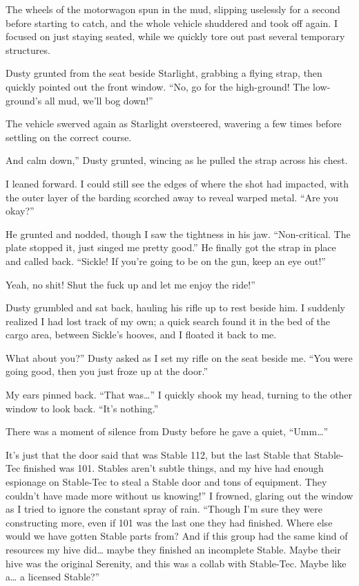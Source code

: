 The wheels of the motorwagon spun in the mud, slipping uselessly for a second before starting to catch, and the whole vehicle shuddered and took off again. I focused on just staying seated, while we quickly tore out past several temporary structures.

Dusty grunted from the seat beside Starlight, grabbing a flying strap, then quickly pointed out the front window. “No, go for the high-ground! The low-ground’s all mud, we’ll bog down!”

The vehicle swerved again as Starlight oversteered, wavering a few times before settling on the correct course.

\leavevmode{}And calm down,” Dusty grunted, wincing as he pulled the strap across his chest.

I leaned forward. I could still see the edges of where the shot had impacted, with the outer layer of the barding scorched away to reveal warped metal. “Are you okay?”

He grunted and nodded, though I saw the tightness in his jaw. “Non-critical. The plate stopped it, just singed me pretty good.” He finally got the strap in place and called back. “Sickle! If you’re going to be on the gun, keep an eye out!”

\leavevmode{}Yeah, no shit! Shut the fuck up and let me enjoy the ride!”

Dusty grumbled and sat back, hauling his rifle up to rest beside him. I suddenly realized I had lost track of my own; a quick search found it in the bed of the cargo area, between Sickle’s hooves, and I floated it back to me.

\leavevmode{}What about you?” Dusty asked as I set my rifle on the seat beside me. “You were going good, then you just froze up at the door.”

My ears pinned back. “That was…” I quickly shook my head, turning to the other window to look back. “It’s nothing.”

There was a moment of silence from Dusty before he gave a quiet, “Umm…”

\leavevmode{}It’s just that the door said that was Stable 112, but the last Stable that Stable-Tec finished was 101. Stables aren’t subtle things, and my hive had enough espionage on Stable-Tec to steal a Stable door and tons of equipment. They couldn’t have made more without us knowing!” I frowned, glaring out the window as I tried to ignore the constant spray of rain. “Though I’m sure they were constructing more, even if 101 was the last one they had finished. Where else would we have gotten Stable parts from? And if this group had the same kind of resources my hive did… maybe they finished an incomplete Stable. Maybe their hive was the original Serenity, and this was a collab with Stable-Tec. Maybe like a… a licensed Stable?”

